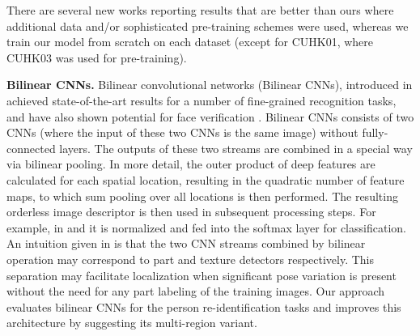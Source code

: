There are several new works reporting results that are better than ours \cite{LiuFQJY17, XiaoLOW16} where additional data and/or sophisticated pre-training schemes were used, whereas we train our model from scratch on each dataset (except for CUHK01, where CUHK03 was used for pre-training).

\textbf{Bilinear CNNs.} Bilinear convolutional networks (Bilinear CNNs), introduced in \cite{lin2015bilinear} achieved state-of-the-art results for a number of fine-grained recognition tasks, and have also shown potential for face verification \cite{roychowdhury2015face}. Bilinear CNNs consists of two CNNs (where the input of these two CNNs is the same image) without fully-connected layers. The outputs of these two streams are combined in a special way via bilinear pooling. In more detail, the outer product of deep features are calculated for each spatial location, resulting in the quadratic number of feature maps, to which sum pooling over all locations is then performed. The resulting orderless image descriptor is then used in subsequent processing steps. For example, in \cite{lin2015bilinear} and \cite{roychowdhury2015face} it is normalized and fed into the softmax layer for classification. An intuition given in \cite{lin2015bilinear} is that the two CNN streams combined by bilinear operation may correspond to part and texture detectors respectively. This separation may facilitate localization when significant pose variation is present without the need for any part labeling of the training images. Our approach evaluates bilinear CNNs for the person re-identification tasks and improves this architecture by suggesting its multi-region variant.




